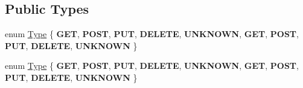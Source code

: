 \subsection*{Public Types}
\begin{DoxyCompactItemize}
\item 
enum \hyperlink{classnetwork_1_1HttpRequest_abcc6d7ee2ea91a721d32fd6d396743fe}{Type} \{ \newline
{\bfseries G\+ET}, 
{\bfseries P\+O\+ST}, 
{\bfseries P\+UT}, 
{\bfseries D\+E\+L\+E\+TE}, 
\newline
{\bfseries U\+N\+K\+N\+O\+WN}, 
{\bfseries G\+ET}, 
{\bfseries P\+O\+ST}, 
{\bfseries P\+UT}, 
\newline
{\bfseries D\+E\+L\+E\+TE}, 
{\bfseries U\+N\+K\+N\+O\+WN}
 \}
\item 
enum \hyperlink{classnetwork_1_1HttpRequest_abcc6d7ee2ea91a721d32fd6d396743fe}{Type} \{ \newline
{\bfseries G\+ET}, 
{\bfseries P\+O\+ST}, 
{\bfseries P\+UT}, 
{\bfseries D\+E\+L\+E\+TE}, 
\newline
{\bfseries U\+N\+K\+N\+O\+WN}, 
{\bfseries G\+ET}, 
{\bfseries P\+O\+ST}, 
{\bfseries P\+UT}, 
\newline
{\bfseries D\+E\+L\+E\+TE}, 
{\bfseries U\+N\+K\+N\+O\+WN}
 \}
\end{DoxyCompactItemize}
